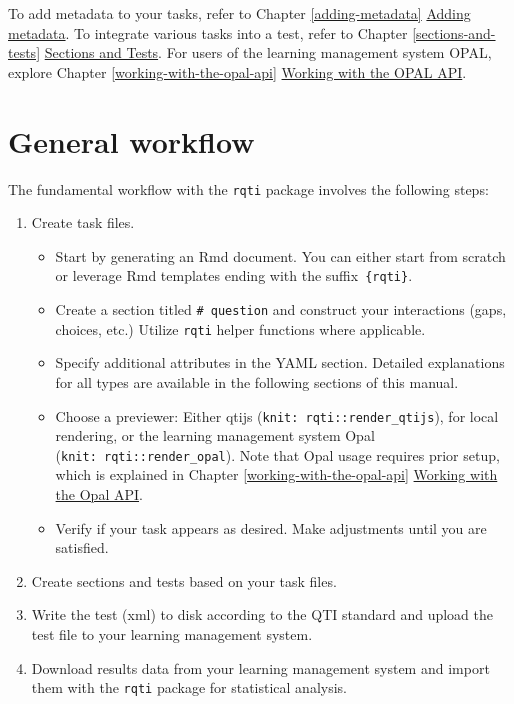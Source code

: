 \documentclass[twoside]{tufte-book}
\providecommand{\tightlist}{%
  \setlength{\itemsep}{0pt}\setlength{\parskip}{0pt}}
\begin{document}
To add metadata to your tasks, refer to Chapter \ref{adding-metadata} \href{Chapters/adding_metadata.html}{Adding metadata}.
To integrate various tasks into a test, refer to Chapter \ref{sections-and-tests} \href{Chapters/section.html}{Sections and Tests}.
For users of the learning management system OPAL, explore Chapter \ref{working-with-the-opal-api} \href{Chapters/api_opal.html}{Working with the OPAL API}.

\section{General workflow}\label{general-workflow}

The fundamental workflow with the \texttt{rqti} package involves the following steps:

\begin{enumerate}
\def\labelenumi{\arabic{enumi}.}
\tightlist
\item
  Create task files.

  \begin{itemize}
  \tightlist
  \item
    Start by generating an Rmd document. You can either start from scratch or leverage Rmd templates ending with the suffix~\texttt{\{rqti\}}.
  \item
    Create a section titled \texttt{\#\ question} and construct your interactions (gaps, choices, etc.) Utilize \texttt{rqti} helper functions where applicable.
  \item
    Specify additional attributes in the YAML section. Detailed explanations for all types are available in the following sections of this manual.
  \item
    Choose a previewer: Either qtijs (\texttt{knit:\ rqti::render\_qtijs}), for local rendering, or the learning management system Opal (\texttt{knit:\ rqti::render\_opal}). Note that Opal usage requires prior setup, which is explained in Chapter \ref{working-with-the-opal-api} \href{Chapters/api_opal.html}{Working with the Opal API}.
  \item
    Verify if your task appears as desired. Make adjustments until you are satisfied.
  \end{itemize}
\item
  Create sections and tests based on your task files.
\item
  Write the test (xml) to disk according to the QTI standard and upload the test file to your learning management system.
\item
  Download results data from your learning management system and import them with the \texttt{rqti} package for statistical analysis.
\end{enumerate}
\end{document}
